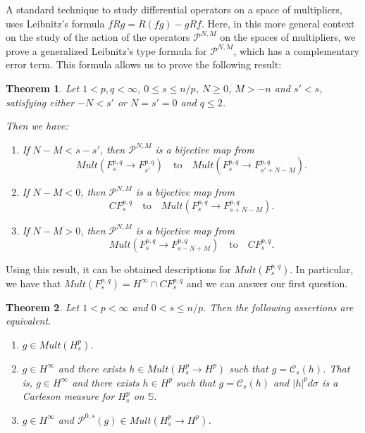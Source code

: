 \documentclass[12pt,twoside,leqno,final]{amsart}
\theoremstyle{plain}
\newtheorem{thm}{Theorem}[section]
\begin{document}
A standard technique to study differential operators on a space of multipliers, uses  Leibnitz's formula $f Rg= R(fg)-gRf$. Here, in this more general context on the study of the action of the operators ${{\mathcal P}}^{N,M}$ on the spaces of multipliers, we prove a generalized Leibnitz's type formula for ${{\mathcal P}}^{N,M}$, which has a complementary error term. This formula allows us to prove the following result:

\begin{thm}\label{thm:bijectMF}
Let $1< p,q<\infty$, $0\le s\le n/p$, $N\ge 0$, $M>-n$ and $s'<  s$, satisfying either 
$-N<s'$ or $N= s'=0$ and $q\le 2$.

Then we have:
\begin{enumerate}
	\item \label{item:bijectMF1} If $N-M< s-s'$, then ${{\mathcal P}}^{N,M}$ is a bijective map from 
$$Mult(F^{p,q}_s\to F^{p,q}_{s'}) \quad\text{to}\quad  
Mult(F^{p,q}_s\to F^{p,q}_{s'+N-M}).$$ 

 \item \label{item:bijectMF3} If $N-M<0$, then ${{\mathcal P}}^{N,M}$ is a bijective map from 
$$CF^{p,q}_s\quad\text{to}\quad Mult(F^{p,q}_s\to F^{p,q}_{s+N-M}).$$

 \item \label{item:bijectMF2} If $N-M>0$, then ${{\mathcal P}}^{N,M}$ is a bijective map from 
$$
Mult(F^{p,q}_s\to F^{p,q}_{s-N+M})\quad\text{to}\quad CF^{p,q}_s.
$$
\end{enumerate}
\end{thm}

Using this result, it can be obtained descriptions for $Mult(F_s^{p,q})$. In particular, we have that
$Mult(F_s^{p,q})=H^\infty \cap CF_s^{p,q}$ and we can answer our first question.

\begin{thm}\label{thm:bijectMH}
Let $1<p<\infty$ and $0< s\le n/p$. Then the following assertions are equivalent.

\begin{enumerate}
	\item\label{item:bijectMH1}$g\in Mult(H^{p}_s)$.
	\item\label{item:bijectMH2} $g\in H^\infty$ and there exists $h\in Mult(H^{p}_s\to H^p)$ such that 
$g=\mathcal{C}_s(h)$. 
That is, $g\in H^\infty$ and there exists $h\in   H^p$ such that 
$g=\mathcal{C}_s(h)$ and $|h|^pd\sigma$ is a Carleson measure for $H_s^p$ on ${{\mathbb S}}$.
   \item\label{item:bijectMH4} $g\in H^\infty$ and ${{\mathcal P}}^{0,s}(g)\in Mult(H^{p}_s\to H^p)$.
\end{enumerate}
\end{thm}
\end{document}
